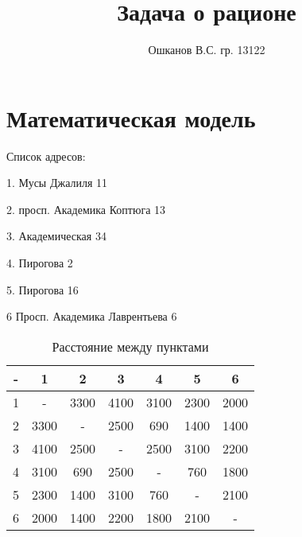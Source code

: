 \documentclass[]{article}
\title{Задача о рационе}
\author{Ошканов В.С. гр. 13122}
\begin{document}
\maketitle
\section{Математическая модель}

Список адресов:

1. Мусы Джалиля 11

2. просп. Академика Коптюга 13

3. Академическая 34

4. Пирогова 2

5. Пирогова 16

6 Просп. Академика Лаврентьева 6
\begin{table}\caption{Расстояние между пунктами}\label{tab:1}
\centering
\begin{tabular}{|c|c|c|c|c|c|c|}
	\hline
- &    1  &   2  &   3  &   4  &   5  &  6  \\
\hline
1 &   -  & 3300 & 4100 & 3100 & 2300 & 2000 \\
\hline
2 & 3300 &  -   & 2500 &  690 & 1400 & 1400 \\
\hline
3 & 4100 & 2500 &  -   & 2500 & 3100 & 2200 \\
\hline
4	& 3100 &  690 & 2500 &  -   & 760  & 1800 \\
\hline
5	& 2300 & 1400 & 3100 &  760 &  -   & 2100 \\
\hline
6 & 2000 & 1400 & 2200 & 1800 & 2100 &  -   \\
\hline

\hline
\end{tabular}
\end{table}
\end{document}

